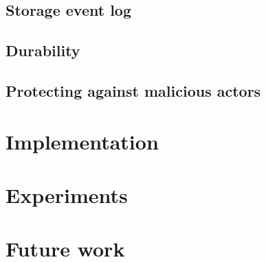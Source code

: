 \documentclass[10pt]{article}
\begin{document}
\subsection{Storage event log}

\subsection{Durability}

\subsection{Protecting against malicious actors}

\section{Implementation}

\section{Experiments}

\section{Future work}
\end{document}
